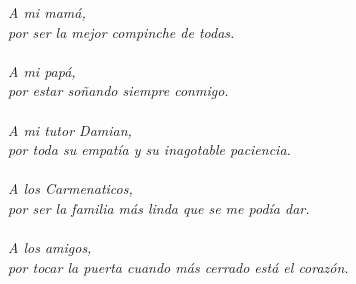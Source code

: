 \begin{dedication}
\emph{A mi mam\'a,\\ por ser la mejor compinche de todas. \\}
\emph{\\A mi pap\'a,\\ por estar so\~nando siempre conmigo. \\} 
\emph{\\A mi tutor Damian,\\ por toda su empat\'ia y su inagotable paciencia. \\}
\emph{\\A los Carmenaticos, \\por ser la familia m\'as linda que se me pod\'ia dar. \\}
\emph{\\A los amigos,\\ por tocar la puerta cuando m\'as cerrado est\'a el coraz\'on.}
\end{dedication}